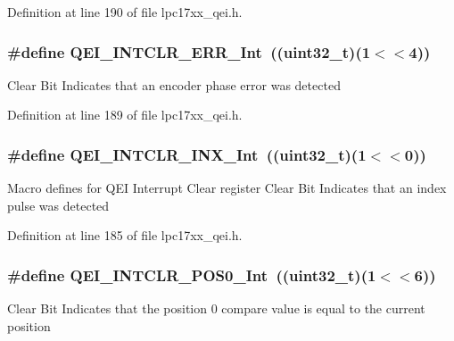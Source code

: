 \-Definition at line 190 of file lpc17xx\-\_\-qei.\-h.

\hypertarget{group___q_e_i___private___macros_gaa319d012505068620cce1f50d0ff4cbc}{
\subsubsection[{\-Q\-E\-I\-\_\-\-I\-N\-T\-C\-L\-R\-\_\-\-E\-R\-R\-\_\-\-Int}]{\setlength{\rightskip}{0pt plus 5cm}\#define {\bf \-Q\-E\-I\-\_\-\-I\-N\-T\-C\-L\-R\-\_\-\-E\-R\-R\-\_\-\-Int}~((uint32\-\_\-t)(1$<$$<$4))}}\label{group___q_e_i___private___macros_gaa319d012505068620cce1f50d0ff4cbc}
\-Clear \-Bit \-Indicates that an encoder phase error was detected 

\-Definition at line 189 of file lpc17xx\-\_\-qei.\-h.

\hypertarget{group___q_e_i___private___macros_ga20dfa07d6e13a8f635e5fc4abe551320}{
\subsubsection[{\-Q\-E\-I\-\_\-\-I\-N\-T\-C\-L\-R\-\_\-\-I\-N\-X\-\_\-\-Int}]{\setlength{\rightskip}{0pt plus 5cm}\#define {\bf \-Q\-E\-I\-\_\-\-I\-N\-T\-C\-L\-R\-\_\-\-I\-N\-X\-\_\-\-Int}~((uint32\-\_\-t)(1$<$$<$0))}}\label{group___q_e_i___private___macros_ga20dfa07d6e13a8f635e5fc4abe551320}
\-Macro defines for \-Q\-E\-I \-Interrupt \-Clear register \-Clear \-Bit \-Indicates that an index pulse was detected 

\-Definition at line 185 of file lpc17xx\-\_\-qei.\-h.

\hypertarget{group___q_e_i___private___macros_ga055e0b556f36d8c3bed0efbd0fddeee8}{
\subsubsection[{\-Q\-E\-I\-\_\-\-I\-N\-T\-C\-L\-R\-\_\-\-P\-O\-S0\-\_\-\-Int}]{\setlength{\rightskip}{0pt plus 5cm}\#define {\bf \-Q\-E\-I\-\_\-\-I\-N\-T\-C\-L\-R\-\_\-\-P\-O\-S0\-\_\-\-Int}~((uint32\-\_\-t)(1$<$$<$6))}}\label{group___q_e_i___private___macros_ga055e0b556f36d8c3bed0efbd0fddeee8}
\-Clear \-Bit \-Indicates that the position 0 compare value is equal to the current position 

